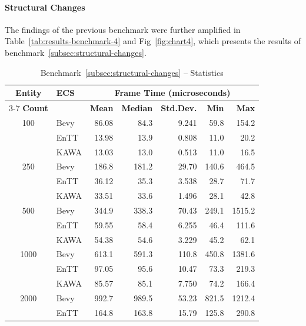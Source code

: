 \documentclass[conference]{IEEEtran}
\begin{document}
    \paragraph*{Structural Changes}The findings of the previous benchmark were further amplified in
    Table~\ref{tab:results-benchmark-4} and Fig~\ref{fig:chart4}, which presents the results of benchmark~\ref{subsec:structural-changes}.

    \begin{table}[htbp]
        \caption{Benchmark~\ref{subsec:structural-changes} – Statistics}
        \begin{center}
            \begin{tabular}{|c|l|r|r|r|r|r|}
                \hline
                \textbf{Entity} & \textbf{ECS} & \multicolumn{5}{|c|}{\textbf{Frame Time (microseconds)}} \\
                \cline{3-7}
                \textbf{Count} & & \textbf{Mean} & \textbf{Median} & \textbf{Std.Dev.} & \textbf{Min} & \textbf{Max} \\
                \hline
                100 & Bevy & 86.08 & 84.3 & 9.241 & 59.8 & 154.2 \\
                & EnTT & 13.98 & 13.9 & 0.808 & 11.0 & 20.2 \\
                & KAWA & 13.03 & 13.0 & 0.513 & 11.0 & 16.5 \\
                \hline
                250 & Bevy & 186.8 & 181.2 & 29.70 & 140.6 & 464.5 \\
                & EnTT & 36.12 & 35.3 & 3.538 & 28.7 & 71.7 \\
                & KAWA & 33.51 & 33.6 & 1.496 & 28.1 & 42.8 \\
                \hline
                500 & Bevy & 344.9 & 338.3 & 70.43 & 249.1 & 1515.2 \\
                & EnTT & 59.55 & 58.4 & 6.255 & 46.4 & 111.6 \\
                & KAWA & 54.38 & 54.6 & 3.229 & 45.2 & 62.1 \\
                \hline
                1000 & Bevy & 613.1 & 591.3 & 110.8 & 450.8 & 1381.6 \\
                & EnTT & 97.05 & 95.6 & 10.47 & 73.3 & 219.3 \\
                & KAWA & 85.57 & 85.1 & 7.750 & 74.2 & 166.4 \\
                \hline
                2000 & Bevy & 992.7 & 989.5 & 53.23 & 821.5 & 1212.4 \\
                & EnTT & 164.8 & 163.8 & 15.79 & 125.8 & 290.8 \\

\end{tabular}
\end{center}
\end{table}
\end{document}
